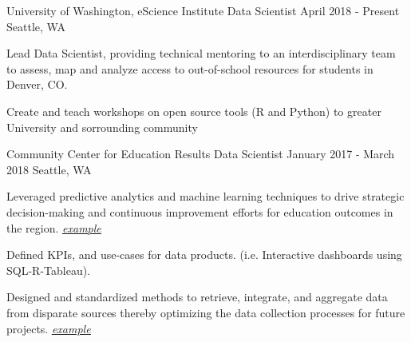 

\begin{cventries}
\cventry
{University of Washington, eScience Institute}
{Data Scientist}
{April 2018 - Present}
{Seattle, WA}
{
  \begin{cvitems}
    \item{Lead Data Scientist, providing technical mentoring to an interdisciplinary team to assess, map and analyze access to out-of-school resources for students in Denver, CO.} %
    \item{Create and teach workshops on open source tools (R and Python) to greater University and sorrounding community}
  \end{cvitems}
}
  \cventry
  {Community Center for Education Results}
  {Data Scientist}
  {January 2017 - March 2018}
  {Seattle, WA}
  {
    \begin{cvitems} 
      \item {Leveraged predictive analytics and machine learning techniques to drive strategic decision-making and continuous improvement efforts for education outcomes in the region. \href{https://docs.google.com/presentation/d/1hXTSttTE6oddJywVadC25Lxk6259VEPO2anXnqbrSZ4/edit?usp=sharing}{\underline{\textit{example}}}}
      \item {Defined KPIs, and use-cases for data products. (i.e. Interactive dashboards using SQL-R-Tableau).}
      \item {Designed and standardized methods to retrieve, integrate, and aggregate data from disparate sources thereby optimizing the data collection processes for future projects. \href{https://github.com/CCER-RMP/S275_ETL}{\underline{\textit{example}}}}
    \end{cvitems} 
  }


\end{cventries}
